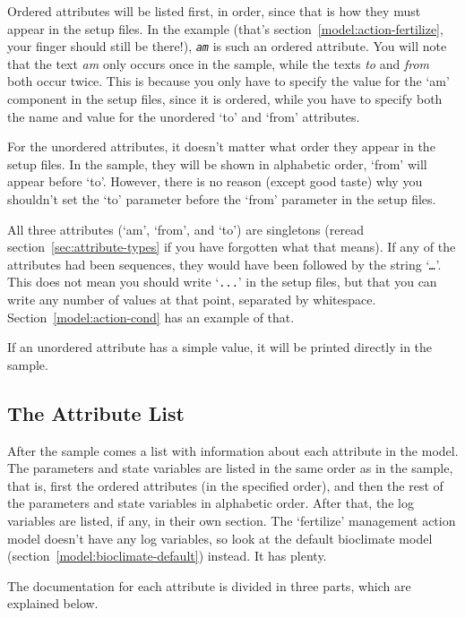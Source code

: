 Ordered attributes will be listed first, in order, since that is how
they must appear in the setup files.  In the example (that's
section~\ref{model:action-fertilize}, your finger should still be
there!), \texttt{\textit{am}} is such an ordered attribute.  You will
note that the text \emph{am} only occurs once in the sample, while the
texts \emph{to} and \emph{from} both occur twice.  This is because you
only have to specify the value for the `am' component in the setup
files, since it is ordered, while you have to specify both the name
and value for the unordered `to' and `from' attributes.

For the unordered attributes, it doesn't matter what order they appear
in the setup files.  In the sample, they will be shown in alphabetic
order, `from' will appear before `to'.  However, there is no reason
(except good taste) why you shouldn't set the `to' parameter before
the `from' parameter in the setup files.

All three attributes (`am', `from', and `to') are singletons (reread
section~\ref{sec:attribute-types} if you have forgotten what that
means).  If any of the attributes had been sequences, they would have
been followed by the string `\texttt{\textit{\ldots{}}}'.  This does
not mean you should write `\texttt{...}' in the setup files, but that
you can write any number of values at that point, separated by
whitespace.  Section~\ref{model:action-cond} has an example of that.

If an unordered attribute has a simple value, it will be printed
directly in the sample.  

\subsection{The Attribute List}
\label{sec:alist-doc}

After the sample comes a list with information about each attribute in
the model.  The parameters and state variables are listed in the same
order as in the sample, that is, first the ordered attributes (in the
specified order), and then the rest of the parameters and state
variables in alphabetic order.  After that, the log variables are
listed, if any, in their own section.  The `fertilize' management
action model doesn't have any log variables, so look at the default
bioclimate model (section~\ref{model:bioclimate-default}) instead.  It
has plenty.

The documentation for each attribute is divided in three parts, which
are explained below.


